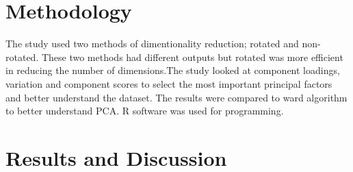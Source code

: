 \documentclass[12pt,a4paper]{article}
\begin{document}
\section{Methodology}
The study used two methods of dimentionality reduction; rotated and non-rotated. These two methods had different outputs but rotated was more efficient in reducing the number of dimensions.The study looked at component loadings, variation and component scores to select the most important principal factors and better understand the dataset. The results were compared to ward algorithm to better understand PCA. R software was used for programming.

\section{Results and Discussion}
\end{document}
